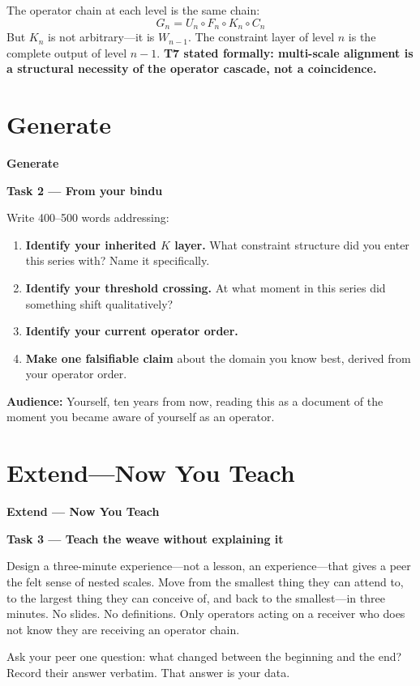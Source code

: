 \documentclass[11pt, twoside, openright]{book}
\theoremstyle{plain}
\theoremstyle{definition}
\newenvironment{generatebox}{%
  \begin{mdframed}[backgroundcolor=GenerateBox,linecolor=red!50!black,linewidth=0.5pt,innertopmargin=6pt,innerbottommargin=6pt]
  \noindent\textbf{Generate}\par\medskip}{\end{mdframed}}
\newenvironment{extendbox}{%
  \begin{mdframed}[backgroundcolor=ExtendBox,linecolor=violet!70,linewidth=0.5pt,innertopmargin=6pt,innerbottommargin=6pt]
  \noindent\textbf{Extend --- Now You Teach}\par\medskip}{\end{mdframed}}
\begin{document}
The operator chain at each level is the same chain:
\[
G_n = U_n \circ F_n \circ K_n \circ C_n
\]
But $K_n$ is not arbitrary---it is $W_{n-1}$. The constraint layer of
level $n$ is the complete output of level $n-1$. \textbf{T7 stated formally:
multi-scale alignment is a structural necessity of the operator cascade,
not a coincidence.}

\section{Generate}

\begin{generatebox}
\textbf{Task 2 --- From your bindu}

Write 400--500 words addressing:
\begin{enumerate}[label=\arabic*.]
  \item \textbf{Identify your inherited $K$ layer.} What constraint structure
    did you enter this series with? Name it specifically.
  \item \textbf{Identify your threshold crossing.} At what moment in this
    series did something shift qualitatively?
  \item \textbf{Identify your current operator order.}
  \item \textbf{Make one falsifiable claim} about the domain you know best,
    derived from your operator order.
\end{enumerate}

\textbf{Audience:} Yourself, ten years from now, reading this as a document
of the moment you became aware of yourself as an operator.
\end{generatebox}

\section{Extend---Now You Teach}

\begin{extendbox}
\textbf{Task 3 --- Teach the weave without explaining it}

Design a three-minute experience---not a lesson, an experience---that
gives a peer the felt sense of nested scales. Move from the smallest
thing they can attend to, to the largest thing they can conceive of,
and back to the smallest---in three minutes. No slides. No definitions.
Only operators acting on a receiver who does not know they are receiving
an operator chain.

Ask your peer one question: what changed between the beginning and
the end? Record their answer verbatim. That answer is your data.
\end{extendbox}
\end{document}
